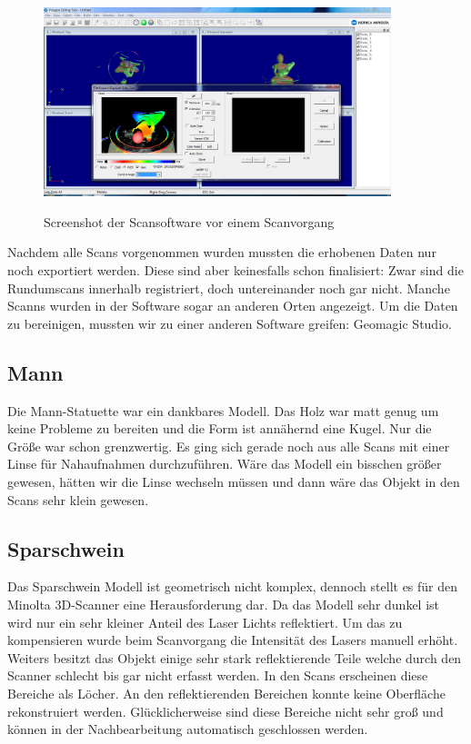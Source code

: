 \documentclass[]{article}
\begin{document}
\begin{figure}[!h]
\caption{Screenshot der Scansoftware vor einem Scanvorgang}
\centering
\includegraphics[width=0.9\textwidth]{images/Statue_Liegend.PNG}
\label{fig:scansoftware}
\end{figure}

Nachdem alle Scans vorgenommen wurden mussten die erhobenen Daten nur noch exportiert werden. Diese sind aber keinesfalls schon finalisiert: Zwar sind die Rundumscans innerhalb registriert, doch untereinander noch gar nicht. Manche Scanns wurden in der Software sogar an anderen Orten angezeigt. Um die Daten zu bereinigen, mussten wir zu einer anderen Software greifen: Geomagic Studio.

\subsection{}
\subsection{Mann}
Die Mann-Statuette war ein dankbares Modell. Das Holz war matt genug um keine Probleme zu bereiten und die Form ist annähernd eine Kugel. Nur die Größe war schon grenzwertig. Es ging sich gerade noch aus alle Scans mit einer Linse für Nahaufnahmen durchzuführen. Wäre das Modell ein bisschen größer gewesen, hätten wir die Linse wechseln müssen und dann wäre das Objekt in den Scans sehr klein gewesen.

\subsection{Sparschwein}
Das Sparschwein Modell ist geometrisch nicht komplex, dennoch stellt es für den Minolta 3D-Scanner eine Herausforderung dar. Da das Modell sehr dunkel ist wird  nur ein sehr kleiner Anteil des Laser Lichts reflektiert. Um das zu kompensieren wurde beim Scanvorgang die Intensität des Lasers manuell erhöht. Weiters besitzt das Objekt einige sehr stark reflektierende Teile welche durch den Scanner schlecht bis gar nicht erfasst werden. In den Scans erscheinen diese Bereiche als Löcher. An den reflektierenden Bereichen konnte keine Oberfläche rekonstruiert werden. Glücklicherweise sind diese Bereiche nicht sehr groß und können in der Nachbearbeitung automatisch geschlossen werden.
\end{document}
